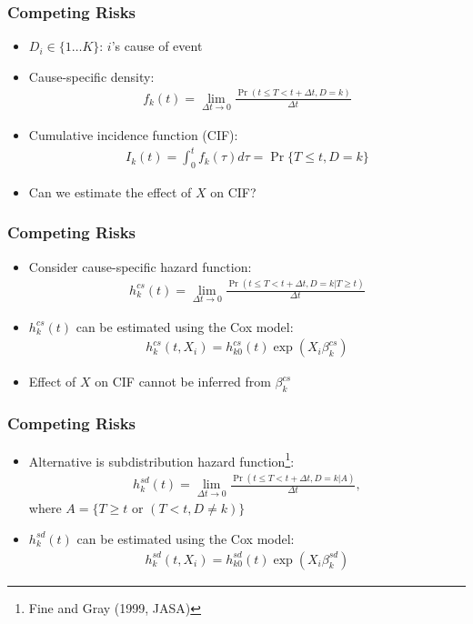 \documentclass[14pt]{beamer}
\begin{document}
	\begin{frame}
	\frametitle{Competing Risks}
	\begin{itemize}
	\item $D_i \in \{1 \dots K \}$: $i$'s cause of event
	\item Cause-specific density:
	\begin{eqnarray*}
	f_k(t) = \lim_{\Delta t \to 0}\frac{\Pr(t \leq T < t + \Delta t, D = k)}{\Delta t}
	\end{eqnarray*}
	\item Cumulative incidence function (CIF):
	\begin{eqnarray*}
	I_k(t) = \int_0^t f_k(\tau)d\tau = \Pr\{T \leq t, D = k \}
	\end{eqnarray*}
	\item Can we estimate the effect of $X$ on CIF?

	\end{itemize}

	\end{frame}

	\begin{frame}
	\frametitle{Competing Risks}
	\begin{itemize}
	\item Consider cause-specific hazard function:
	\begin{eqnarray*}
	h_k^{cs} (t) = \lim_{\Delta t \to 0}\frac{\Pr(t \leq T < t + \Delta t, D = k | T \geq t)}{\Delta t}
	\end{eqnarray*}
	\item $h_k^{cs} (t)$ can be estimated using the Cox model:
	\begin{eqnarray*}
	h_k^{cs} (t, X_i) = h_{k0}^{cs} (t) \exp(X_i \beta_k^{cs})
	\end{eqnarray*}
	\item Effect of $X$ on CIF cannot be inferred from $\beta_k^{cs}$

	\end{itemize}

	\end{frame}

	\begin{frame}
	\frametitle{Competing Risks}
	\begin{itemize}
	\item Alternative is subdistribution hazard function\footnote{Fine and Gray (1999, JASA)}:
	\begin{eqnarray*}
	h_k^{sd} (t) = \lim_{\Delta t \to 0}\frac{\Pr(t \leq T < t + \Delta t, D = k | A)}{\Delta t},
	\end{eqnarray*}
	where $A = \{T \geq t \text{ or } (T < t, D \neq k)\}$
	\item $h_k^{sd} (t)$ can be estimated using the Cox model:
	\begin{eqnarray*}
	h_k^{sd} (t, X_i) = h_{k0}^{sd} (t) \exp(X_i \beta_k^{sd})
	\end{eqnarray*}

	\end{itemize}

	\end{frame}
\end{document}
